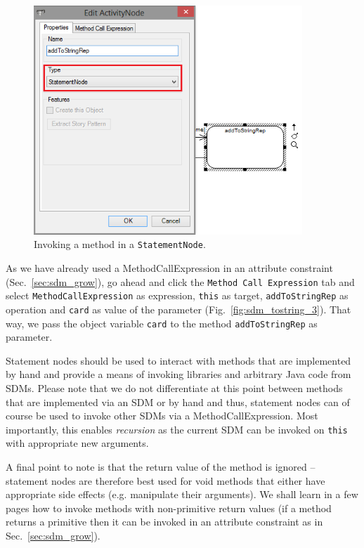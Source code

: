 \begin{figure}[htbp]
\begin{center}
  \includegraphics[width=0.9\textwidth]{pics/sdmBilder/toString/sdm73.png}
  \caption{Invoking a method in a \texttt{StatementNode}.}  
  \label{fig:sdm_tostring_2}
\end{center}
\end{figure}

As we have already used a MethodCallExpression in an attribute constraint
(Sec.~\ref{sec:sdm_grow}), go ahead and click the \texttt{Method Call
Expression} tab and select \texttt{MethodCallExpression} as expression,
\texttt{this} as target, \texttt{addToStringRep} as operation and \texttt{card} as value of the parameter (Fig.~\ref{fig:sdm_tostring_3}). That way, we pass the object variable \texttt{card} to the method
\texttt{addToStringRep} as parameter.

Statement nodes should be used to interact with methods that are
implemented by hand and provide a means of invoking libraries and arbitrary Java
code from SDMs.  Please note that we do not differentiate at this point between
methods that are implemented via an SDM or by hand and thus, statement nodes can
of course be used to invoke other SDMs via a MethodCallExpression.  Most
importantly, this enables \emph{recursion} as the current SDM can be invoked on
\texttt{this} with appropriate new arguments.  

A final point to note is that the
return value of the method is ignored -- statement nodes are therefore best used
for void methods that either have appropriate side effects (e.g. manipulate
their arguments).  We shall learn in a few pages how to invoke
methods with non-primitive return values (if a method returns a primitive then it can be
invoked in an attribute constraint as in Sec.~\ref{sec:sdm_grow}).

